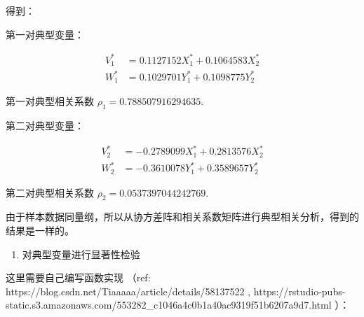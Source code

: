 \documentclass[11pt]{article}
\providecommand{\tightlist}{%
      \setlength{\itemsep}{0pt}\setlength{\parskip}{0pt}}
\begin{document}
    
    得到：

第一对典型变量：

\[
\begin{aligned}
V_1^* &= 0.1127152 X_1^* + 0.1064583 X_2^* \\
W_1^* &= 0.1029701 Y_1^* + 0.1098775 Y_2^*
\end{aligned}
\]

第一对典型相关系数 \(\rho_1 = 0.788507916294635\).

第二对典型变量：

\[
\begin{aligned}
V_2^* &= -0.2789099 X_1^* + 0.2813576 X_2^* \\
W_2^* &= -0.3610078 Y_1^* + 0.3589657 Y_2^*
\end{aligned}
\]

第二对典型相关系数 \(\rho_2 = 0.0537397044242769\).

由于样本数据同量纲，所以从协方差阵和相关系数矩阵进行典型相关分析，得到的结果是一样的。

    \begin{enumerate}
\def\labelenumi{\arabic{enumi}.}
\setcounter{enumi}{2}
\tightlist
\item
  对典型变量进行显著性检验
\end{enumerate}

    这里需要自己编写函数实现 （ref:
https://blog.csdn.net/Tiaaaaa/article/details/58137522 ,
https://rstudio-pubs-static.s3.amazonaws.com/553282\_c1046a4c0b1a40ac9319f51b6207a9d7.html
）：
\end{document}
